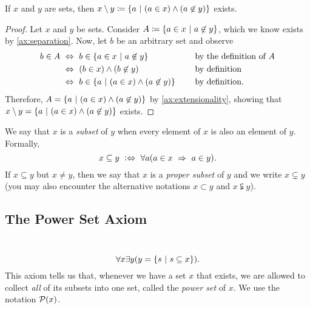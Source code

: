 \begin{theorem}
    If $x$ and $y$ are sets,
    then $x \setminus y \defn \set*{a \suchthat (a \in x) \meet (a \not \in y)}$ exists.
\end{theorem}
\begin{proof}
    Let $x$ and $y$ be sets.
    Consider $A \defn \set*{a \in x \suchthat a \not \in y}$,
    which we know exists by \autoref{ax:separation}.
    Now, let $b$ be an arbitrary set and observe
    \begin{alignat*}{2}
        b \in A &\iff b \in \set*{a \in x \suchthat a \not \in y} &&\text{by the definition of $A$} \\
                &\iff \pn*{b \in x} \meet \pn*{b \not \in y} &&\text{by definition} \\
                &\iff b \in \set*{a \suchthat \pn*{a \in x} \meet \pn*{a \not \in y}}~~~~&&\text{by definition}.
    \end{alignat*}
    Therefore, $A = \set*{a \suchthat \pn*{a \in x} \meet \pn*{a \not \in y}}$ by \autoref{ax:extensionality},
    showing that $x \setminus y = \set*{a \suchthat \pn*{a \in x} \meet \pn*{a \not \in y}}$ exists.
\end{proof}

\begin{definition}[Subsets]
    We say that $x$ is a \emph{subset} of $y$ when every element of $x$ is also an element of $y$.
    Formally,
    \[
        x \subseteq y \iffdefn \forall a \pn*{a \in x \implies a \in y}.
    \]
    If $x \subseteq y$ but $x \neq y$,
    then we say that $x$ is a \emph{proper subset} of $y$ and we write $x \subsetneq y$
    (you may also encounter the alternative notations $x \subset y$ and $x \subsetneqq y$).
\end{definition}

\subsection{The Power Set Axiom}
\begin{axiom}
    ~\vspace{-\baselineskip}
    \[
        \forall x \exists y \pn*{y = \set*{s \suchthat s \subseteq x}}.
    \]
    This axiom tells us that, whenever we have a set $x$ that exists,
    we are allowed to collect \emph{all} of its subsets into one set, called the \emph{power set} of $x$.
    We use the notation $\power{x}$.
\end{axiom}

